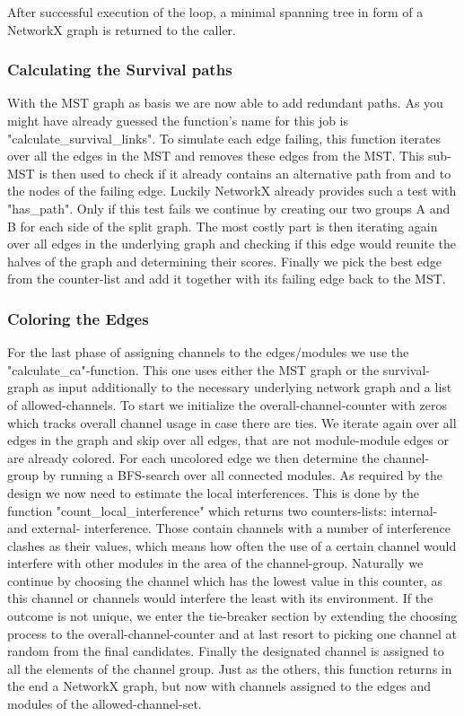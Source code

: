 	After successful execution of the loop, a minimal spanning tree in form of a NetworkX graph is returned to the caller.
	
      \subsubsection{Calculating the Survival paths}
	With the \ac{MST} graph as basis we are now able to add redundant paths. 
	As you might have already guessed the function's name for this job is "calculate\_survival\_links".
	To simulate each edge failing, this function iterates over all the edges in the \ac{MST} and removes these edges from the \ac{MST}.
	This sub-MST is then used to check if it already contains an alternative path from and to the nodes of the failing edge.
	Luckily NetworkX already provides such a test with "has\_path". 
	Only if this test fails we continue by creating our two groups A and B for each side of the split graph.
	The most costly part is then iterating again over all edges in the underlying graph and checking if this edge would reunite the halves of the graph and determining 
	their scores.
	Finally we pick the best edge from the counter-list and add it together with its failing edge back to the \ac{MST}.
	
      \subsubsection{Coloring the Edges}
	For the last phase of assigning channels to the edges/modules we use the "calculate\_ca"-function. 
	This one uses either the \ac{MST} graph or the survival-graph as input additionally to the necessary underlying network graph and a list of allowed-channels.
	To start we initialize the overall-channel-counter with zeros which tracks overall channel usage in case there are ties.
	We iterate again over all edges in the graph and skip over all edges, that are not module-module edges or are already colored. 
	For each uncolored edge we then determine the channel-group by running a \ac{BFS}-search over all connected modules.
	As required by the design we now need to estimate the local interferences.
	This is done by the function "count\_local\_interference" which returns two counters-lists: internal- and external- interference.
	Those contain channels with a number of interference clashes as their values, 
	which means how often the use of a certain channel would interfere with other modules in the area of the channel-group.
	Naturally we continue by choosing the channel which has the lowest value in this counter, 
	as this channel or channels would interfere the least 	with its environment. 
	If the outcome is not unique, we enter the tie-breaker section by extending the choosing process to the overall-channel-counter 
	and at last resort to picking one channel at random from the final candidates.
	Finally the designated channel is assigned to all the elements of the channel group.
	Just as the others, this function returns in the end a NetworkX graph, but now with channels assigned to the edges and modules of the allowed-channel-set.

